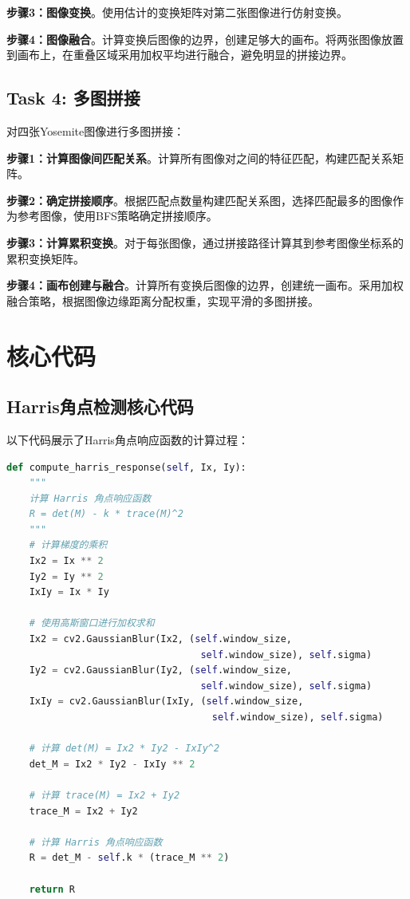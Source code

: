 \documentclass[a4paper]{article}
\begin{document}
\textbf{步骤3：图像变换}。使用估计的变换矩阵对第二张图像进行仿射变换。

\textbf{步骤4：图像融合}。计算变换后图像的边界，创建足够大的画布。将两张图像放置到画布上，在重叠区域采用加权平均进行融合，避免明显的拼接边界。

\subsection{Task 4: 多图拼接}
对四张Yosemite图像进行多图拼接：

\textbf{步骤1：计算图像间匹配关系}。计算所有图像对之间的特征匹配，构建匹配关系矩阵。

\textbf{步骤2：确定拼接顺序}。根据匹配点数量构建匹配关系图，选择匹配最多的图像作为参考图像，使用BFS策略确定拼接顺序。

\textbf{步骤3：计算累积变换}。对于每张图像，通过拼接路径计算其到参考图像坐标系的累积变换矩阵。

\textbf{步骤4：画布创建与融合}。计算所有变换后图像的边界，创建统一画布。采用加权融合策略，根据图像边缘距离分配权重，实现平滑的多图拼接。

\section{核心代码}

\subsection{Harris角点检测核心代码}

以下代码展示了Harris角点响应函数的计算过程：

\begin{lstlisting}[language=Python, caption=Harris角点响应函数计算]
def compute_harris_response(self, Ix, Iy):
    """
    计算 Harris 角点响应函数
    R = det(M) - k * trace(M)^2
    """
    # 计算梯度的乘积
    Ix2 = Ix ** 2
    Iy2 = Iy ** 2
    IxIy = Ix * Iy
    
    # 使用高斯窗口进行加权求和
    Ix2 = cv2.GaussianBlur(Ix2, (self.window_size,
                                  self.window_size), self.sigma)
    Iy2 = cv2.GaussianBlur(Iy2, (self.window_size,
                                  self.window_size), self.sigma)
    IxIy = cv2.GaussianBlur(IxIy, (self.window_size,
                                    self.window_size), self.sigma)
    
    # 计算 det(M) = Ix2 * Iy2 - IxIy^2
    det_M = Ix2 * Iy2 - IxIy ** 2
    
    # 计算 trace(M) = Ix2 + Iy2
    trace_M = Ix2 + Iy2
    
    # 计算 Harris 角点响应函数
    R = det_M - self.k * (trace_M ** 2)
    
    return R
\end{lstlisting}
\end{document}
